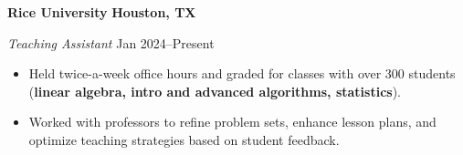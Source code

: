 \textbf{Rice University} \hfill \textbf{Houston, TX}\par
\textit{Teaching Assistant} \hfill Jan 2024--Present
\begin{itemize}
		\item Held twice-a-week office hours and graded for classes with over 300 students (\textbf{linear algebra, intro and advanced algorithms, statistics}).
		\item Worked with professors to refine problem sets, enhance lesson plans, and optimize teaching strategies based on student feedback.
\end{itemize}\par


